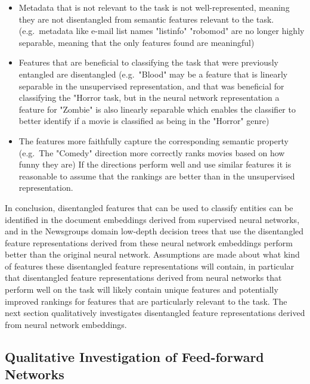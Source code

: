 \begin{itemize}
	\item Metadata that is not relevant to the task is not well-represented, meaning they are not disentangled from semantic features relevant to the task. (e.g.\ metadata like e-mail list names "listinfo" "robomod" are no longer highly separable, meaning that the only features found are meaningful)
	\item Features that are beneficial to classifying the task that were previously entangled are disentangled  (e.g.\ "Blood" may be a feature that is linearly separable in the unsupervised representation, and that was beneficial for classifying the "Horror task, but in the neural network representation a feature for "Zombie" is also linearly separable which enables the classifier to better identify if a movie is classified as being in the "Horror" genre)
	\item The features more faithfully capture the corresponding semantic property (e.g.\ The "Comedy" direction more correctly ranks movies based on how funny they are) If the directions perform well and use similar features it is reasonable to assume that the rankings are better than in the unsupervised representation.
\end{itemize}

In conclusion, disentangled features that can be used to classify entities can be identified in the document embeddings derived from supervised neural networks, and in the Newsgroups domain  low-depth decision trees that use the disentangled feature representations derived from these neural network embeddings perform  better than the original neural network. Assumptions are made about what kind of features these disentangled feature representations will contain, in particular that disentangled feature representations derived from neural networks that perform well on the task will likely contain unique features and potentially improved rankings for features that are particularly relevant to the task.  The next section qualitatively investigates  disentangled feature representations derived from neural network  embeddings.

\subsection{Qualitative Investigation of Feed-forward Networks}\label{ch5:qual}


